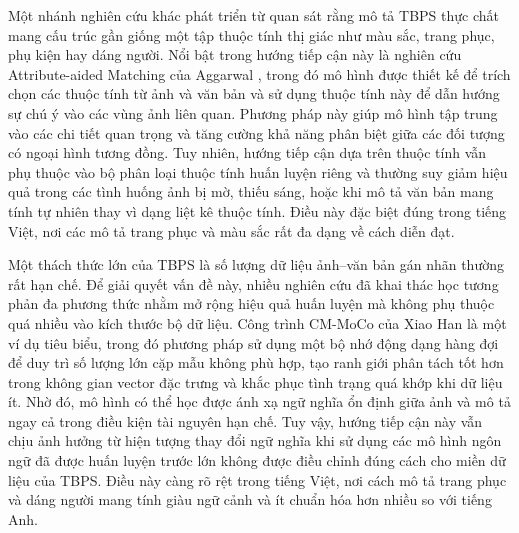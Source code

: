 \documentclass{jstarticle}
\begin{document}
Một nhánh nghiên cứu khác phát triển từ quan sát rằng mô tả TBPS thực chất mang cấu trúc gần giống một tập thuộc tính thị giác như màu sắc, trang phục, phụ kiện hay dáng người. Nổi bật trong hướng tiếp cận này là nghiên cứu Attribute-aided Matching của Aggarwal \cite{aggarwal2020text}, trong đó mô hình được thiết kế để trích chọn các thuộc tính từ ảnh và văn bản và sử dụng thuộc tính này để dẫn hướng sự chú ý vào các vùng ảnh liên quan. Phương pháp này giúp mô hình tập trung vào các chi tiết quan trọng và tăng cường khả năng phân biệt giữa các đối tượng có ngoại hình tương đồng. Tuy nhiên, hướng tiếp cận dựa trên thuộc tính vẫn phụ thuộc vào bộ phân loại thuộc tính huấn luyện riêng và thường suy giảm hiệu quả trong các tình huống ảnh bị mờ, thiếu sáng, hoặc khi mô tả văn bản mang tính tự nhiên thay vì dạng liệt kê thuộc tính. Điều này đặc biệt đúng trong tiếng Việt, nơi các mô tả trang phục và màu sắc rất đa dạng về cách diễn đạt.


Một thách thức lớn của TBPS là số lượng dữ liệu ảnh–văn bản gán nhãn thường rất hạn chế. Để giải quyết vấn đề này, nhiều nghiên cứu đã khai thác học tương phản đa phương thức nhằm mở rộng hiệu quả huấn luyện mà không phụ thuộc quá nhiều vào kích thước bộ dữ liệu. Công trình CM-MoCo của Xiao Han \cite{han2021text} là một ví dụ tiêu biểu, trong đó phương pháp sử dụng một bộ nhớ động dạng hàng đợi để duy trì số lượng lớn cặp mẫu không phù hợp, tạo ranh giới phân tách tốt hơn trong không gian vector đặc trưng và khắc phục tình trạng quá khớp khi dữ liệu ít. Nhờ đó, mô hình có thể học được ánh xạ ngữ nghĩa ổn định giữa ảnh và mô tả ngay cả trong điều kiện tài nguyên hạn chế. Tuy vậy, hướng tiếp cận này vẫn chịu ảnh hưởng từ hiện tượng thay đổi ngữ nghĩa khi sử dụng các mô hình ngôn ngữ đã được huấn luyện trước lớn không được điều chỉnh đúng cách cho miền dữ liệu của TBPS. Điều này càng rõ rệt trong tiếng Việt, nơi cách mô tả trang phục và dáng người mang tính giàu ngữ cảnh và ít chuẩn hóa hơn nhiều so với tiếng Anh.
\end{document}
